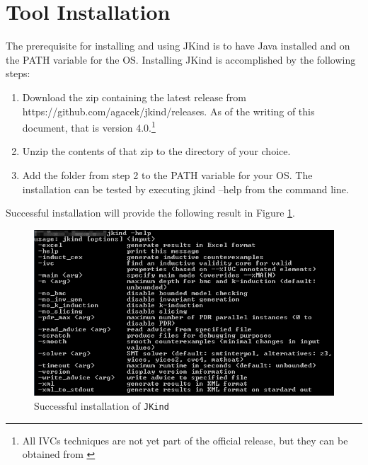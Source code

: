 \section{Tool Installation}
The prerequisite for installing and using JKind is to have Java installed and on the PATH variable for the OS.
Installing JKind is accomplished by the following steps:
\begin{enumerate}
  \item Download the zip containing the latest release from https://github.com/agacek/jkind/releases. As of the writing of this document, that is version 4.0.\footnote{All IVCs techniques are not yet part of the official release, but they can be obtained from \cite{mygit}}
  \item Unzip the contents of that zip to the directory of your choice.
  \item Add the folder from step 2 to the PATH variable for your OS.
The installation can be tested by executing jkind –help from the command line. 
\end{enumerate}
Successful installation will provide the following result in Figure \ref{fig:jkins}.

 \begin{figure}
 \centering
  \includegraphics[width=\columnwidth]{figs/jkindcon.png}
  \caption{Successful installation of \texttt{JKind}}
  \vspace{0.1in}
  \label{fig:jkins}
\end{figure}

